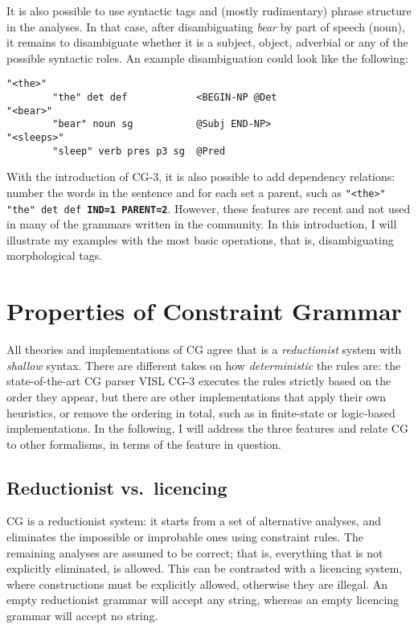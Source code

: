 It is also possible to use syntactic tags and (mostly rudimentary) phrase
structure in the analyses. In that
case, after disambiguating \emph{bear} by part of speech (noun), it
remains to disambiguate whether it is a subject, object, adverbial or
any of the possible syntactic roles. An example disambiguation could
look like the following:


\begin{verbatim}
"<the>"
        "the" det def            <BEGIN-NP @Det
"<bear>"
        "bear" noun sg           @Subj END-NP>
"<sleeps>"
        "sleep" verb pres p3 sg  @Pred

\end{verbatim}

With the introduction of CG-3, it is also possible to add dependency
relations: number the words in the sentence and for each set a parent,
such as \texttt{"<the>" "the" det def  \textbf{IND=1 PARENT=2}}. 
However, these features are recent and not used in many of the grammars written 
in the community. In this introduction, I will illustrate my examples with the 
most basic operations, that is, disambiguating morphological tags.


\section*{Properties of Constraint Grammar}\label{properties}

All theories and implementations of CG agree that is a \emph{reductionist}
system with \emph{shallow} syntax. There are different takes on how
\emph{deterministic} the rules are: the state-of-the-art CG parser VISL CG-3
executes the rules strictly based on the order they appear, but there
are other implementations that apply their own heuristics, or remove the
ordering in total, such as in finite-state or logic-based implementations. 
In the following, I will address the three features and relate CG to
other formalisms, in terms of the feature in question.

\subsection*{Reductionist vs.~licencing}\label{reductionist-vs.licencing}

CG is a reductionist system: it starts from a set of alternative
analyses, and eliminates the impossible or improbable ones using
constraint rules. The remaining analyses are assumed to be correct; that
is, everything that is not explicitly eliminated, is allowed. This can
be contrasted with a licencing system, where constructions must
be explicitly allowed, otherwise they are illegal. An empty
reductionist grammar will accept any string, whereas an empty
licencing grammar will accept no string.


